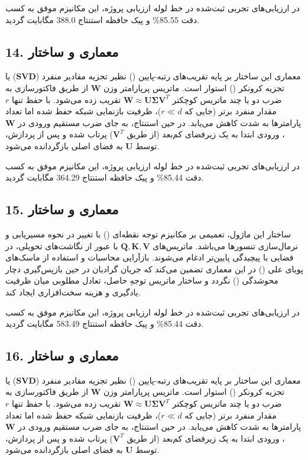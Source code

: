 \documentclass[12pt,a4paper]{report}
\theoremstyle{definition}
\begin{document}
در ارزیابی‌های تجربی ثبت‌شده در خط لوله ارزیابی پروژه، این مکانیزم موفق به کسب دقت 85.55\% و پیک حافظه استنتاج 388.0 مگابایت گردید.

\subsection*{14. معماری و ساختار }
معماری این ساختار بر پایه تقریب‌های رتبه-پایین () نظیر تجزیه مقادیر منفرد ($\mathbf{SVD}$) یا تجزیه کرونکر () استوار است. ماتریس پرپارامتر وزن $\mathbf{W}$ از طریق فاکتورسازی به ضرب دو یا چند ماتریس کوچکتر $\mathbf{W} \approx \mathbf{U} \mathbf{\Sigma} \mathbf{V}^T$ تقریب زده می‌شود. با حفظ تنها $r$ مقدار منفرد برتر (جایی که $r \ll d$)، ظرفیت بازنمایی شبکه حفظ شده اما تعداد پارامترها به شدت کاهش می‌یابد. در حین استنتاج، به جای ضرب مستقیم ورودی در $\mathbf{W}$، ورودی ابتدا به یک زیرفضای کم‌بعد (از طریق $\mathbf{V}^T$) پرتاب شده و پس از پردازش، توسط $\mathbf{U}$ به فضای اصلی بازگردانده می‌شود.

در ارزیابی‌های تجربی ثبت‌شده در خط لوله ارزیابی پروژه، این مکانیزم موفق به کسب دقت 85.44\% و پیک حافظه استنتاج 364.29 مگابایت گردید.

\subsection*{15. معماری و ساختار }
ساختار این ماژول، تعمیمی بر مکانیزم توجه نقطه‌ای () با تغییر در نحوه مسیریابی و نرمال‌سازی تنسورها می‌باشد. ماتریس‌های $\mathbf{Q, K, V}$ با عبور از نگاشت‌های تحویلی، در فضایی با پیچیدگی پایین‌تر ادغام می‌شوند. بازآرایی محاسبات و استفاده از ماسک‌های پویای علی () در این معماری تضمین می‌کند که جریان گرادیان در حین بازپس‌گیری دچار محوشدگی () نگردد و ساختار ماتریس توجهِ حاصل، تعادل مطلوبی میان ظرفیت یادگیری و هزینه سخت‌افزاری ایجاد کند.

در ارزیابی‌های تجربی ثبت‌شده در خط لوله ارزیابی پروژه، این مکانیزم موفق به کسب دقت 85.44\% و پیک حافظه استنتاج 583.49 مگابایت گردید.

\subsection*{16. معماری و ساختار }
معماری این ساختار بر پایه تقریب‌های رتبه-پایین () نظیر تجزیه مقادیر منفرد ($\mathbf{SVD}$) یا تجزیه کرونکر () استوار است. ماتریس پرپارامتر وزن $\mathbf{W}$ از طریق فاکتورسازی به ضرب دو یا چند ماتریس کوچکتر $\mathbf{W} \approx \mathbf{U} \mathbf{\Sigma} \mathbf{V}^T$ تقریب زده می‌شود. با حفظ تنها $r$ مقدار منفرد برتر (جایی که $r \ll d$)، ظرفیت بازنمایی شبکه حفظ شده اما تعداد پارامترها به شدت کاهش می‌یابد. در حین استنتاج، به جای ضرب مستقیم ورودی در $\mathbf{W}$، ورودی ابتدا به یک زیرفضای کم‌بعد (از طریق $\mathbf{V}^T$) پرتاب شده و پس از پردازش، توسط $\mathbf{U}$ به فضای اصلی بازگردانده می‌شود.
\end{document}
